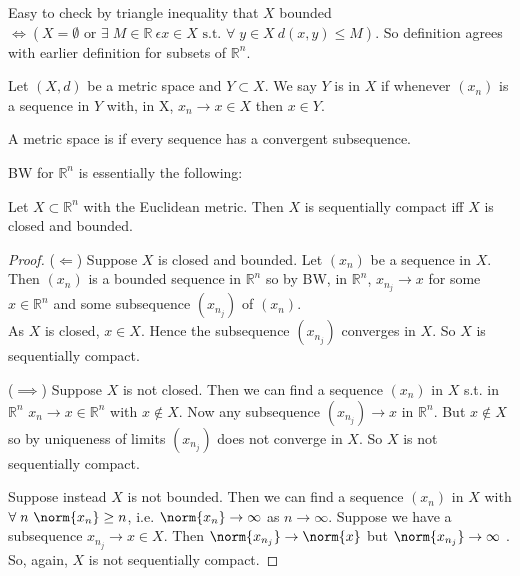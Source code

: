 \begin{remark}
    Easy to check by triangle inequality that $X$ bounded $\iff (X = \emptyset \text{ or } \exists \; M \in \mathbb{R} \ \epsilon x \in X \text{ s.t. } \forall \; y \in X \ d(x, y) \leq M)$.
    So definition agrees with earlier definition for subsets of $\mathbb{R}^n$.
\end{remark} 

\begin{definition}
    Let $(X, d)$ be a metric space and $Y \subset X$.
    We say $Y$ is  in $X$ if whenever $(x_n)$ is a sequence in $Y$ with, in X, $x_n \to x \in X$ then $x \in Y$.
\end{definition} 

\begin{definition}
    A metric space is  if every sequence has a convergent subsequence.
\end{definition}  

BW for $\mathbb{R}^n$ is essentially the following:
\begin{theorem} \label{thm:20}
    Let $X \subset \mathbb{R}^n$ with the Euclidean metric.
    Then $X$ is sequentially compact iff $X$ is closed and bounded.
\end{theorem} 

\begin{proof}
    ($\Longleftarrow$) Suppose $X$ is closed and bounded.
    Let $(x_n)$ be a sequence in $X$.
    Then $(x_n)$ is a bounded sequence in $\mathbb{R}^n$ so by BW, in $\mathbb{R}^n$, $x_{n_j} \to x$ for some $ x \in \mathbb{R}^n$ and some subsequence $(x_{n_j})$ of $(x_n)$. \\
    As $X$ is closed, $x \in X$.
    Hence the subsequence $(x_{n_j})$ converges in $X$.
    So $X$ is sequentially compact.

    ($\implies$) Suppose $X$ is not closed.
    Then we can find a sequence $(x_n)$ in $X$ s.t. in $\mathbb{R}^n$ $x_n \to x \in \mathbb{R}^n$ with $x \notin X$.
    Now any subsequence $(x_{n_j}) \to x$ in $\mathbb{R}^n$.
    But $x \notin X$ so by uniqueness of limits $(x_{n_j})$ does not converge in $X$.
    So $X$ is not sequentially compact.

    Suppose instead $X$ is not bounded.
    Then we can find a sequence $(x_n)$ in $X$ with $\forall \; n \ \norm{x_n} \geq n$, i.e. $\norm{x_n} \to \infty$ as $n \to \infty$.
    Suppose we have a subsequence $x_{n_j} \to x \in X$.
    Then $\norm{x_{n_j}} \to \norm{x}$ but $\norm{x_{n_j}} \to \infty$ \Lightning.
    So, again, $X$ is not sequentially compact.
\end{proof} 

